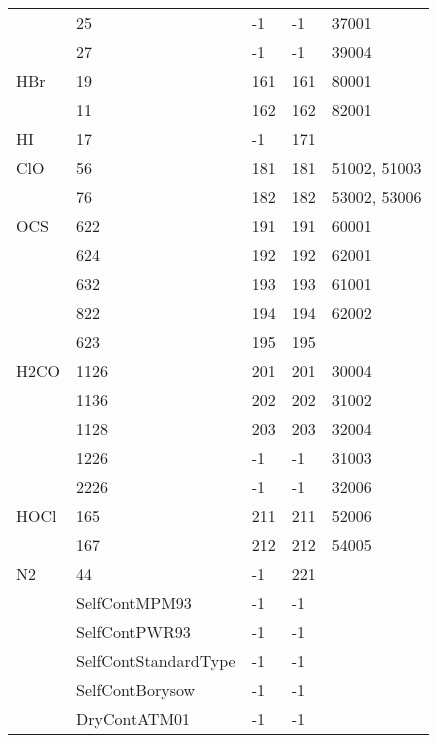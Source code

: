 \begin{longtable}{lllll}
     &25&  -1&    -1&  37001\\
     &27&  -1&    -1&  39004\\
\hline                  
  HBr& 19&  161&   161&  80001\\
     & 11&  162&   162&  82001\\
\hline                  
  HI& 17&  -1&   171&\\
\hline                  
  ClO& 56&  181&   181&  51002, 51003\\
     & 76&  182&   182&  53002, 53006\\
\hline                  
  OCS& 622&  191&   191&  60001\\
     & 624&  192&   192&  62001\\
     & 632&  193&   193&  61001\\
     & 822&  194&   194&  62002\\
     & 623&  195&   195&       \\
\hline                  
  H2CO& 1126&  201&   201&  30004\\
      & 1136&  202&   202&  31002\\
      & 1128&  203&   203&  32004\\
      & 1226&  -1&    -1&  31003\\
      & 2226&  -1&    -1&  32006\\
\hline                  
  HOCl& 165&  211&   211&  52006\\
      & 167&  212&   212&  54005\\
\hline                  
  N2& 44&  -1&   221&\\
    &SelfContMPM93&             -1      &-1     \\
    &SelfContPWR93&             -1      &-1     \\
    &SelfContStandardType&      -1      &-1     \\
    &SelfContBorysow&           -1      &-1     \\
    &DryContATM01&              -1      &-1     \\



\end{longtable}
